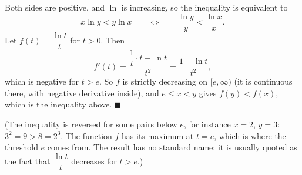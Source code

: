 Both sides are positive, and $\ln$ is increasing, so the inequality is equivalent to
\[
x\ln y<y\ln x\qquad\Longleftrightarrow\qquad\dfrac{\ln y}{y}<\dfrac{\ln x}{x}.
\]
Let $f(t)=\dfrac{\ln t}{t}$ for $t>0$. Then
\[
f'(t)=\dfrac{\dfrac{1}{t}\cdot t-\ln t}{t^2}=\dfrac{1-\ln t}{t^2},
\]
which is negative for $t>e$. So $f$ is strictly decreasing on $[e,\infty)$ (it is continuous there, with negative derivative inside), and $e\le x<y$ gives $f(y)<f(x)$, which is the inequality above. $\blacksquare$

(The inequality is reversed for some pairs below $e$, for instance $x=2$, $y=3$: $3^2=9>8=2^3$. The function $f$ has its maximum at $t=e$, which is where the threshold $e$ comes from. The result has no standard name; it is usually quoted as the fact that $\dfrac{\ln t}{t}$ decreases for $t>e$.)
